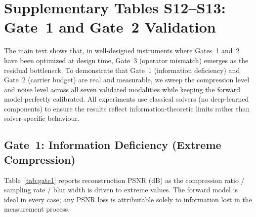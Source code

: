 \documentclass[11pt]{article}
\begin{document}
\newpage
\section{Supplementary Tables S12--S13: Gate~1 and Gate~2 Validation}
\label{sec:gate12}

The main text shows that, in well-designed instruments where Gates~1 and~2
have been optimized at design time, Gate~3 (operator mismatch) emerges as the
residual bottleneck. To demonstrate that
Gate~1 (information deficiency) and Gate~2 (carrier budget) are real and
measurable, we sweep the compression level and noise level across all
seven validated modalities while keeping the forward model perfectly
calibrated.  All experiments use classical solvers (no deep-learned
components) to ensure the results reflect information-theoretic limits
rather than solver-specific behaviour.

\subsection{Gate~1: Information Deficiency (Extreme Compression)}

Table~\ref{tab:gate1} reports reconstruction PSNR (dB) as the
compression ratio / sampling rate / blur width is driven to extreme
values.  The forward model is ideal in every case; any PSNR loss is
attributable solely to information lost in the measurement process.
\end{document}
